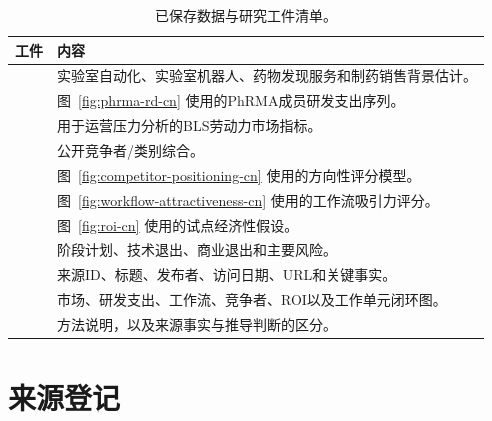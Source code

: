 \documentclass[11pt,fontset=none]{ctexart}
\begin{document}
\begin{table}[H]
\centering
\small
\begin{tabularx}{\linewidth}{@{}L{5.0cm}Y@{}}
\toprule
\textbf{工件} & \textbf{内容} \\
\midrule
{} & 实验室自动化、实验室机器人、药物发现服务和制药销售背景估计。 \\
 & 图~\ref{fig:phrma-rd-cn} 使用的PhRMA成员研发支出序列。 \\
 & 用于运营压力分析的BLS劳动力市场指标。 \\
 & 公开竞争者/类别综合。 \\
 & 图~\ref{fig:competitor-positioning-cn} 使用的方向性评分模型。 \\
 & 图~\ref{fig:workflow-attractiveness-cn} 使用的工作流吸引力评分。 \\
 & 图~\ref{fig:roi-cn} 使用的试点经济性假设。 \\
 & 阶段计划、技术退出、商业退出和主要风险。 \\
 & 来源ID、标题、发布者、访问日期、URL和关键事实。 \\
 & 市场、研发支出、工作流、竞争者、ROI以及工作单元闭环图。 \\
 & 方法说明，以及来源事实与推导判断的区分。 \\
\bottomrule
\end{tabularx}
\caption{已保存数据与研究工件清单。}
\label{tab:artifacts-cn}
\end{table}

\clearpage
\section{来源登记}
\end{document}
